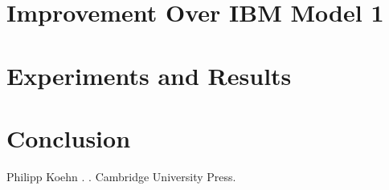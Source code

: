 \documentclass[11pt]{article}
\begin{document}
\section{Improvement Over IBM Model 1}
\label{Improvment}

\section{Experiments and Results}
\label{Eval}

\section{Conclusion}
\label{Concl}

\begin{thebibliography}{}
\bibitem[1]{}
Philipp Koehn
.
.
\newblock Cambridge University Press.

\end{thebibliography}
\end{document}

